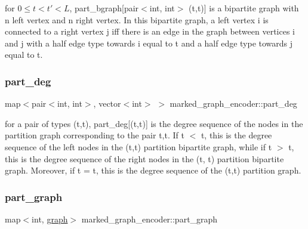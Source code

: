 for $0 \leq t < t' < L$, part\+\_\+bgraph\mbox{[}pair$<$int, int$>$ (t,t\textquotesingle{})\mbox{]} is a bipartite graph with n left vertex and n right vertex. In this bipartite graph, a left vertex i is connected to a right vertex j iff there is an edge in the graph between vertices i and j with a half edge type towards i equal to t and a half edge type towards j equal to t\textquotesingle{}. 

\mbox{\label{classmarked__graph__encoder_a55ea2edb2609dfc287432f61900d6ad1}} 
\subsubsection{\texorpdfstring{part\+\_\+deg}{part\_deg}}
{\footnotesize\ttfamily map$<$pair$<$int, int$>$, vector$<$int$>$ $>$ marked\+\_\+graph\+\_\+encoder\+::part\+\_\+deg\hspace{0.3cm}{\ttfamily [private]}}



for a pair of types (t,t\textquotesingle{}), part\+\_\+deg\mbox{[}(t,t\textquotesingle{})\mbox{]} is the degree sequence of the nodes in the partition graph corresponding to the pair t,t\textquotesingle{}. If t $<$ t\textquotesingle{}, this is the degree sequence of the left nodes in the (t,t\textquotesingle{}) partition bipartite graph, while if t $>$ t\textquotesingle{}, this is the degree sequence of the right nodes in the (t\textquotesingle{}, t) partition bipartite graph. Moreover, if t = t\textquotesingle{}, this is the degree sequence of the (t,t) partition graph. 

\mbox{\label{classmarked__graph__encoder_adbafd0769ae301acc1b2c19b5e1d4844}} 
\subsubsection{\texorpdfstring{part\+\_\+graph}{part\_graph}}
{\footnotesize\ttfamily map$<$int, \hyperlink{classgraph}{graph}$>$ marked\+\_\+graph\+\_\+encoder\+::part\+\_\+graph\hspace{0.3cm}{\ttfamily [private]}}



